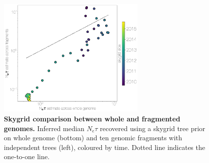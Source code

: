 \documentclass[11pt,oneside,letterpaper]{article}
\begin{document}
\begin{figure}[h]
\centering
	\includegraphics[width=0.65\textwidth]{figures/mers_skygrid_comparison.png}
	\caption{\textbf{Skygrid comparison between whole and fragmented genomes.}
Inferred median $N_{e}\tau$ recovered using a skygrid tree prior on whole genome (bottom) and ten genomic fragments with independent trees (left), coloured by time.
Dotted line indicates the one-to-one line.
	}
	\label{skygrid_comparison}
\end{figure}
\end{document}
